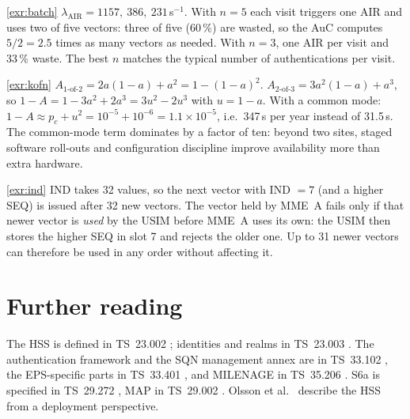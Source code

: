 \documentclass[11pt,a4paper]{article}
\begin{document}
\begin{solutionbox}{\ref{exr:batch}}
$\lambda_{\mathrm{AIR}} = 1157,\ 386,\ 231$\,s$^{-1}$. With $n=5$ each visit triggers one AIR and uses two of five
vectors: three of five (60\,\%) are wasted, so the AuC computes $5/2 = 2.5$ times as many vectors as needed.
With $n = 3$, one AIR per visit and 33\,\% waste. The best $n$ matches the typical number of authentications
per visit.
\end{solutionbox}

\begin{solutionbox}{\ref{exr:kofn}}
$A_{1\text{-of-}2} = 2a(1-a) + a^2 = 1-(1-a)^2$. $A_{2\text{-of-}3} = 3a^2(1-a) + a^3$, so $1-A = 1 - 3a^2 + 2a^3
= 3u^2 - 2u^3$ with $u = 1-a$. With a common mode: $1-A \approx p_c + u^2 = 10^{-5} + 10^{-6} = 1.1\times10^{-5}$,
i.e.\ 347\,s per year instead of 31.5\,s. The common-mode term dominates by a factor of ten: beyond two sites,
staged software roll-outs and configuration discipline improve availability more than extra hardware.
\end{solutionbox}

\begin{solutionbox}{\ref{exr:ind}}
IND takes 32 values, so the next vector with IND $= 7$ (and a higher SEQ) is issued after 32 new vectors.
The vector held by MME~A fails only if that newer vector is \emph{used} by the USIM before MME~A uses its own:
the USIM then stores the higher SEQ in slot 7 and rejects the older one. Up to 31 newer vectors can therefore
be used in any order without affecting it.
\end{solutionbox}

\section{Further reading}
The HSS is defined in TS~23.002 \cite{ts23002}; identities and realms in TS~23.003 \cite{ts23003}. The
authentication framework and the SQN management annex are in TS~33.102 \cite{ts33102}, the EPS-specific parts in
TS~33.401 \cite{ts33401}, and MILENAGE in TS~35.206 \cite{ts35206}. S6a is specified in TS~29.272 \cite{ts29272},
MAP in TS~29.002 \cite{ts29002}. Olsson et al.\ \cite{olsson2013epc} describe the HSS from a deployment
perspective.

\printbibliography[heading=subbibliography,title={\ACNstrRefs}]
\end{document}

